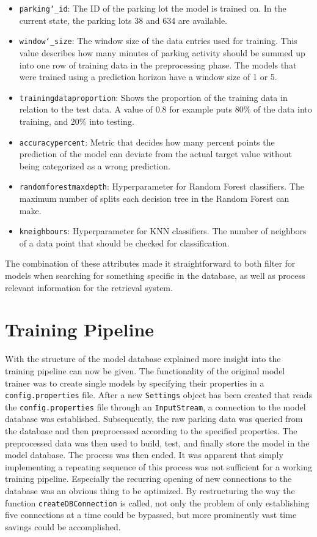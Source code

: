 \begin{itemize}
	\item \texttt{parking\char`_id}: The ID of the parking lot the model is trained on. In the current state, the parking lots 38 and 634 are available.
\item \texttt{window\char`_size}: The window size of the data entries used for training. This value describes how many minutes of parking activity should be summed up into one row of training data in the preprocessing phase. The models that were trained using a prediction horizon have a window size of 1 or 5.  
\item \texttt{trainingdataproportion}: Shows the proportion of the training data in relation to the test data. A value of 0.8 for example puts 80\% of the data into training, and 20\% into testing. 
\item \texttt{accuracypercent}: Metric that decides how many percent points the prediction of the model can deviate from the actual target value without being categorized as a wrong prediction. 
\item \texttt{randomforestmaxdepth}: Hyperparameter for Random Forest classifiers. The maximum number of splits each decision tree in the Random Forest can make.
\item \texttt{kneighbours}: Hyperparameter for KNN classifiers. The number of neighbors of a data point that should be checked for classification. 
\end{itemize}

The combination of these attributes made it straightforward to both filter for models when searching for something specific in the database, as well as process relevant information for the retrieval system.




\section{Training Pipeline}

With the structure of the model database explained more insight into the training pipeline can now be given. The functionality of the original model trainer was to create single models by specifying their properties in a \texttt{config.properties} file. After a new \texttt{Settings} object has been created that reads the \texttt{config.properties} file through an \texttt{InputStream}, a connection to the model database was established. Subsequently, the raw parking data was queried from the database and then preprocessed according to the specified properties. The preprocessed data was then used to build, test, and finally store the model in the model database. The process was then ended. It was apparent that simply implementing a repeating sequence of this process was not sufficient for a working training pipeline. Especially the recurring opening of new connections to the database was an obvious thing to be optimized. By restructuring the way the function \texttt{createDBConnection} is called, not only the problem of only establishing five connections at a time could be bypassed, but more prominently vast time savings could be accomplished. 

